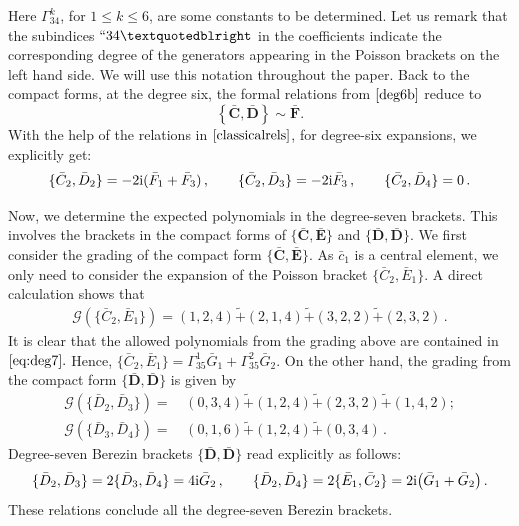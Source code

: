 \documentclass[10pt]{amsart}
\theoremstyle{definition}
\theoremstyle{corollary}
\theoremstyle{remark}
\theoremstyle{conclusion}
\begin{document}
Here $\Gamma_{34}^k$,  for $1 \leq k \leq 6$, are some constants to be determined. Let us remark that the subindices $``34 \textquotedblright$ in the coefficients indicate the corresponding degree of the generators appearing in the Poisson brackets on the left hand side. We will use this notation throughout the paper. Back to the compact forms, at the degree six, the formal relations from $\eqref{deg6b}$ reduce to 
\begin{equation}
  \left\{\bar{\textbf{C}},\bar{\textbf{D}}\right\} \sim \bar{\textbf{F}}.
\end{equation}  With the help of the relations in $\eqref{classicalrels}$, for degree-six expansions, we explicitly get:
\begin{equation}
\{\bar{C}_2, \bar{D}_2\}=-2{\rm i} (\bar{F}_1+\bar{F}_3) \, , \qquad \{\bar{C}_2, \bar{D}_3\}= -2 {\rm i} \bar{F}_3 \, , \qquad \{\bar{C}_2, \bar{D}_4\}=0 \, .
\end{equation}




Now, we determine the expected polynomials in the degree-seven brackets. This involves the brackets in the compact forms of $\{\bar{\textbf{C}},\bar{\textbf{E}}\}$ and $\{\bar{\textbf{D}},\bar{\textbf{D}}\}.$  We first consider the grading of the compact form  $\{\bar{\textbf{C}},\bar{\textbf{E}}\}$. As $\bar{c}_1$ is a central element, we only need to consider the expansion of the Poisson bracket $\{\bar{C}_2,\bar{E}_1\}.$  A direct calculation shows that  \begin{align}
    \mathcal{G} \left( \{\bar{C}_2, \bar{E}_1\}\right) = (1,2,4) \tilde{+} (2,1,4) \tilde{+}    (3,2,2)   \tilde{+}  (2,3,2) \, . \label{eq:deg7}
\end{align}   It is clear that the allowed polynomials from the grading above are contained in $\eqref{eq:deg7}.$ Hence, $\{\bar{C}_2,\bar{E}_1\} = \Gamma_{35}^1 \bar{G}_1 + \Gamma_{35}^2 \bar{G}_2.$ On the other hand, the grading from the compact form $\{\bar{\textbf{D}},\bar{\textbf{D}}\}$ is given by \begin{align*}
    \mathcal{G} \left( \{\bar{D}_2,\bar{D}_3\} \right) = & \, (0,3,4) \tilde{+}  (1,2,4) \tilde{+} (2,3,2) \tilde{+} (1,4,2) ; \\
    \mathcal{G} \left( \{\bar{D}_3,\bar{D}_4\}\right) = &  \, (0,1,6) \tilde{+} (1,2,4) \tilde{+} (0,3,4) \,. 
\end{align*}
Degree-seven Berezin brackets $\{\bar{\textbf{D}},\bar{\textbf{D}}\}$ read explicitly as follows:
\begin{equation}
\{\bar{D}_2, \bar{D}_3\}=2\{\bar{D}_3, \bar{D}_4\}=4{\rm i}\bar{G}_2 \, , \qquad \{\bar{D}_2, \bar{D}_4\}=2\{\bar{E}_1, \bar{C}_2\}=2{\rm i}\bigl(\bar{G}_1+\bar{G}_2\bigl) \, .
\end{equation} These relations conclude all the degree-seven Berezin brackets.
\end{document}
